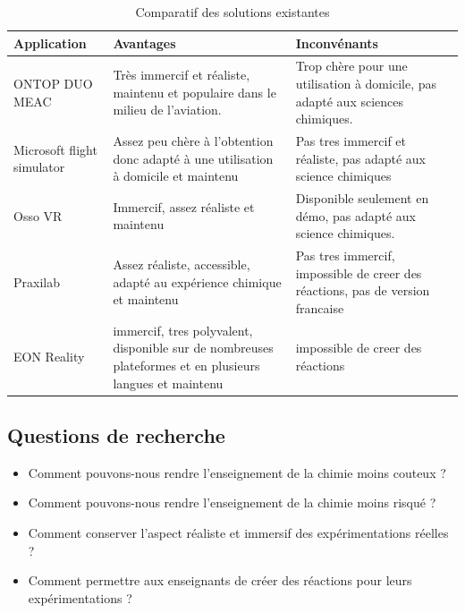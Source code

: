 \begin{table}[H]
	\centering
	\caption{Comparatif des solutions existantes}
	\begin{tabular}{|l|p{5cm}|p{5cm}|}
		\hline
		\textbf{Application}       & \textbf{Avantages}                                                                                      & \textbf{Inconvénants}                                                          \\ \hline
		ONTOP DUO MEAC             & Très immercif et réaliste, maintenu et populaire dans le milieu de l'aviation.                          & Trop chère pour une utilisation à domicile, pas adapté aux sciences chimiques. \\ \hline
		Microsoft flight simulator & Assez peu chère à l'obtention donc adapté à une utilisation à domicile et maintenu                      & Pas tres immercif et réaliste, pas adapté aux science chimiques                \\ \hline
		Osso VR                    & Immercif, assez réaliste et maintenu                                                                    & Disponible seulement en démo, pas adapté aux science chimiques.                \\ \hline
		Praxilab                   & Assez réaliste, accessible, adapté au expérience chimique et maintenu                                   & Pas tres immercif, impossible de creer des réactions, pas de version francaise \\ \hline
		EON Reality                & immercif, tres polyvalent, disponible sur de nombreuses plateformes et en plusieurs langues et maintenu & impossible de creer des réactions                                              \\ \hline
	\end{tabular}
\end{table}

\subsection{Questions de recherche}

\begin{itemize}
	\item Comment pouvons-nous rendre l'enseignement de la chimie moins couteux ?
	\item Comment pouvons-nous rendre l'enseignement de la chimie moins risqué ?
	\item Comment conserver l'aspect réaliste et immersif des expérimentations réelles ?
	\item Comment permettre aux enseignants de créer des réactions pour leurs expérimentations ?
\end{itemize}

